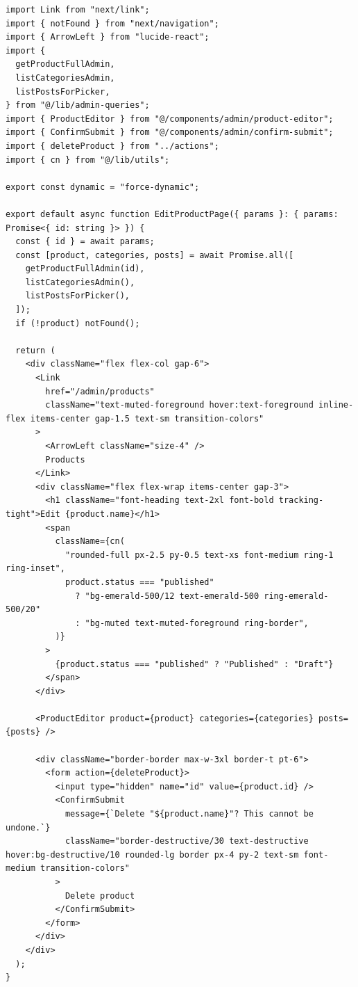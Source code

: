 \documentclass[11pt,a4paper]{article}
\begin{document}
\begin{lstlisting}
import Link from "next/link";
import { notFound } from "next/navigation";
import { ArrowLeft } from "lucide-react";
import {
  getProductFullAdmin,
  listCategoriesAdmin,
  listPostsForPicker,
} from "@/lib/admin-queries";
import { ProductEditor } from "@/components/admin/product-editor";
import { ConfirmSubmit } from "@/components/admin/confirm-submit";
import { deleteProduct } from "../actions";
import { cn } from "@/lib/utils";

export const dynamic = "force-dynamic";

export default async function EditProductPage({ params }: { params: Promise<{ id: string }> }) {
  const { id } = await params;
  const [product, categories, posts] = await Promise.all([
    getProductFullAdmin(id),
    listCategoriesAdmin(),
    listPostsForPicker(),
  ]);
  if (!product) notFound();

  return (
    <div className="flex flex-col gap-6">
      <Link
        href="/admin/products"
        className="text-muted-foreground hover:text-foreground inline-flex items-center gap-1.5 text-sm transition-colors"
      >
        <ArrowLeft className="size-4" />
        Products
      </Link>
      <div className="flex flex-wrap items-center gap-3">
        <h1 className="font-heading text-2xl font-bold tracking-tight">Edit {product.name}</h1>
        <span
          className={cn(
            "rounded-full px-2.5 py-0.5 text-xs font-medium ring-1 ring-inset",
            product.status === "published"
              ? "bg-emerald-500/12 text-emerald-500 ring-emerald-500/20"
              : "bg-muted text-muted-foreground ring-border",
          )}
        >
          {product.status === "published" ? "Published" : "Draft"}
        </span>
      </div>

      <ProductEditor product={product} categories={categories} posts={posts} />

      <div className="border-border max-w-3xl border-t pt-6">
        <form action={deleteProduct}>
          <input type="hidden" name="id" value={product.id} />
          <ConfirmSubmit
            message={`Delete "${product.name}"? This cannot be undone.`}
            className="border-destructive/30 text-destructive hover:bg-destructive/10 rounded-lg border px-4 py-2 text-sm font-medium transition-colors"
          >
            Delete product
          </ConfirmSubmit>
        </form>
      </div>
    </div>
  );
}
\end{lstlisting}
\end{document}
